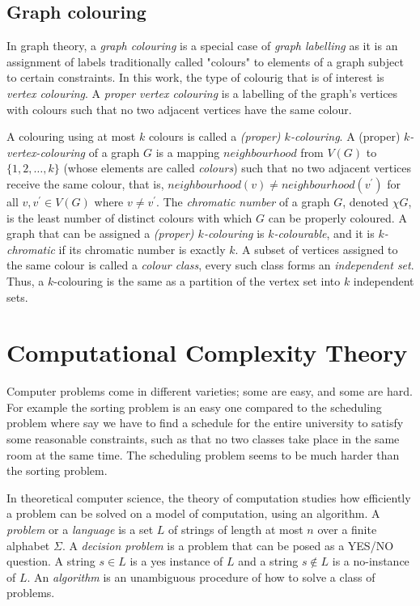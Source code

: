 \subsection{Graph colouring}
In graph theory, a \textit{graph colouring} is a special case of \textit{graph labelling} as it is an assignment of labels traditionally
called "colours" to elements of a graph subject to certain constraints. In this work, the type of colourig that is of interest is
\textit{vertex colouring}. A \textit{proper vertex colouring} is a labelling of the graph’s vertices with colours such that no two adjacent
vertices have the same colour.

A colouring using at most $k$ colours is called a \textit{(proper) $k$-colouring}.
A (proper) \textit{$k$-vertex-colouring} of a graph $G$ is a mapping $neighbourhood$ from $V(G)$ to $\{1, 2, \dots, k\}$ (whose elements are called
\textit{colours}) such that no two adjacent vertices receive the same colour, that is, $neighbourhood(v) \neq neighbourhood(v^{'})$ for all $v, v^{'} \in V(G)$
where $v \neq v^{'}$.
The \textit{chromatic number} of a graph $G$, denoted $\chi{G}$, is the least number of distinct colours with which $G$ can be properly coloured.
A graph that can be assigned a \textit{(proper) $k$-colouring} is \textit{$k$-colourable}, and it is \textit{$k$-chromatic} if its chromatic number
is exactly $k$. A subset of vertices assigned to the same colour is called a \textit{colour class}, every such class forms an
\textit{independent set}. Thus, a $k$-colouring is the same as a partition of the vertex set into $k$ independent sets.


\section{Computational Complexity Theory} \label{sec:complexity}
Computer problems come in different varieties; some are easy, and some are hard. For example the sorting problem is an easy one compared to the
scheduling problem where say we have to find a schedule for the entire university to satisfy some reasonable constraints, such as that no two classes
take place in the same room at the same time. The scheduling problem seems to be much harder than the sorting problem.

In theoretical computer science, the theory of computation studies how efficiently a problem can be solved on a model of computation, using an
algorithm. A \textit{problem} or a \textit{language} is a set $L$ of strings of length at most $n$ over a finite alphabet $\Sigma$.
A \textit{decision problem} is a problem that can be posed as a YES/NO question. A string $s \in L$ is a yes instance of $L$ and a string $s \notin L$ is
a no-instance of $L$. An \textit{algorithm} is an unambiguous procedure of how to solve a class of problems.

